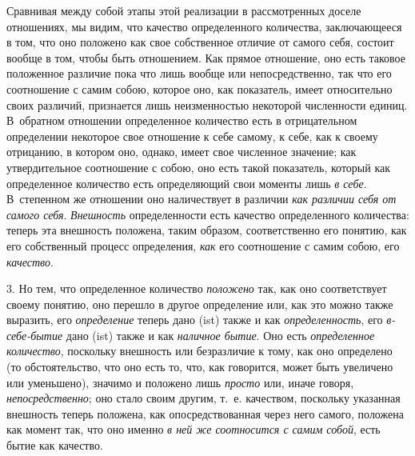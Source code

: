 Сравнивая между собой этапы этой реализации в рассмотренных доселе
отношениях, мы видим, что качество определенного количества, заключающееся
в том, что оно положено как свое собственное отличие от самого себя,
состоит вообще в том, чтобы быть отношением. Как прямое отношение, оно есть
таковое положенное различие пока что лишь вообще или непосредственно, так
что его соотношение с самим собою, которое оно, как показатель, имеет
относительно своих различий, признается лишь неизменностью некоторой
численности единиц. В~обратном отношении определенное количество есть в
отрицательном определении некоторое свое отношение к себе самому, к себе,
как к своему отрицанию, в котором оно, однако, имеет свое численное
значение; как утвердительное соотношение с собою, оно есть такой
показатель, который как определенное количество есть определяющий свои
моменты лишь {\em в себе}. В~степенном же отношении оно
наличествует в различии {\em как различии себя от
самого себя}. {\em Внешность} определенности есть
качество определенного количества: теперь эта внешность положена, таким
образом, соответственно его понятию, как его собственный процесс
определения, {\em как} его соотношение с самим собою,
его {\em качество}.

3. Но тем, что определенное количество {\em положено}
так, как оно соответствует своему понятию, оно перешло в другое определение
или, как это можно также выразить, его
{\em определение} теперь дано (ist) также и как
{\em определенность}, его
{\em в-себе-бытие} дано (ist) также и как
{\em наличное бытие}. Оно есть
{\em определенное количество}, поскольку внешность или
безразличие к тому, как оно определено (то обстоятельство, что оно есть то,
что, как говорится, может быть увеличено или уменьшено), значимо и положено
лишь {\em просто} или, иначе говоря,
{\em непосредственно}; оно стало своим другим, т.~е.
качеством, поскольку указанная внешность теперь положена, как
опосредствованная через него самого, положена как момент так, что оно
именно {\em в ней же соотносится с самим собой}, есть
бытие как качество.

